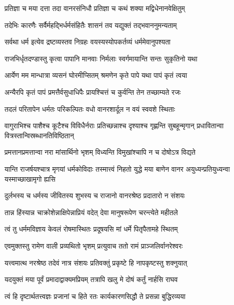 \twolineshloka
{प्रतिज्ञा च मया दत्ता तदा वानरसंनिधौ}
{प्रतिज्ञा च कथं शक्या मद्विधेनानवेक्षितुम्} %

\twolineshloka
{तदेभिः कारणैः सर्वैर्महद्भिर्धर्मसंहितैः}
{शासनं तव यद्युक्तं तद्भवाननुमन्यताम्} %

\twolineshloka
{सर्वथा धर्म इत्येव द्रष्टव्यस्तव निग्रहः}
{वयस्यस्योपकर्तव्यं धर्ममेवानुपश्यता} %

\twolineshloka
{राजभिर्धृतदण्डास्तु कृत्वा पापानि मानवाः}
{निर्मलाः स्वर्गमायान्ति सन्तः सुकृतिनो यथा} %

\twolineshloka
{आर्येण मम मान्धात्रा व्यसनं घोरमीप्सितम्}
{श्रमणेन कृते पापे यथा पापं कृतं त्वया} %

\twolineshloka
{अन्यैरपि कृतं पापं प्रमत्तैर्वसुधाधिपैः}
{प्रायश्चित्तं च कुर्वन्ति तेन तच्छाम्यते रजः} %

\twolineshloka
{तदलं परितापेन धर्मतः परिकल्पितः}
{वधो वानरशार्दूल न वयं स्ववशे स्थिताः} %

\threelineshloka
{वागुराभिश्च पाशैश्च कूटैश्च विविधैर्नराः}
{प्रतिच्छन्नाश्च दृश्याश्च गृह्णन्ति सुबहून्मृगान्}
{प्रधावितान्वा वित्रस्तान्विस्रब्धानतिविष्ठितान्} %

\twolineshloka
{प्रमत्तानप्रमत्तान्वा नरा मांसार्थिनो भृशम्}
{विध्यन्ति विमुखांश्चापि न च दोषोऽत्र विद्यते} %

\threelineshloka
{यान्ति राजर्षयश्चात्र मृगयां धर्मकोविदाः}
{तस्मात्त्वं निहतो युद्धे मया बाणेन वानर}
{अयुध्यन्प्रतियुध्यन्वा यस्माच्छाखामृगो ह्यसि} %

\twolineshloka
{दुर्लभस्य च धर्मस्य जीवितस्य शुभस्य च}
{राजानो वानरश्रेष्ठ प्रदातारो न संशयः} %

\twolineshloka
{तान्न हिंस्यान्न चाक्रोशेन्नाक्षिपेन्नाप्रियं वदेत्}
{देवा मानुषरूपेण चरन्त्येते महीतले} %

\twolineshloka
{त्वं तु धर्ममविज्ञाय केवलं रोषमास्थितः}
{प्रदूषयसि मां धर्मे पितृपैतामहे स्थितम्} %

\twolineshloka
{एवमुक्तस्तु रामेण वाली प्रव्यथितो भृशम्}
{प्रत्युवाच ततो रामं प्राञ्जलिर्वानरेश्वरः} %

\twolineshloka
{यत्त्वमात्थ नरश्रेष्ठ तदेवं नात्र संशयः}
{प्रतिवक्तुं प्रकृष्टे हि नापकृष्टस्तु शक्नुयात्} %

\twolineshloka
{यदयुक्तं मया पूर्वं प्रमादाद्वाक्यमप्रियम्}
{तत्रापि खलु मे दोषं कर्तुं नार्हसि राघव} %

\twolineshloka
{त्वं हि दृष्टार्थतत्त्वज्ञः प्रजानां च हिते रतः}
{कार्यकारणसिद्धौ ते प्रसन्ना बुद्धिरव्यया} %

